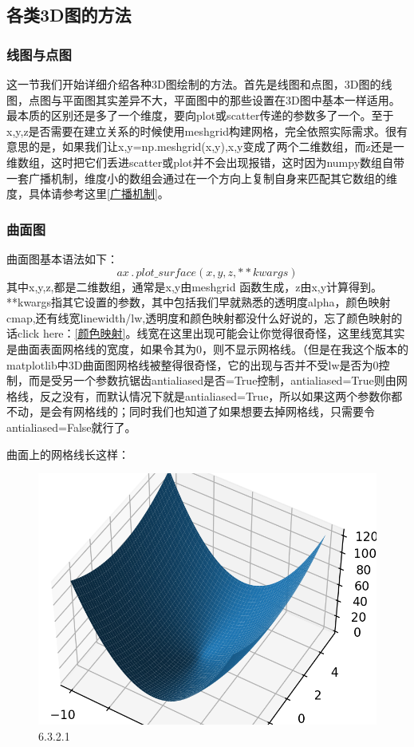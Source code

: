 \documentclass[12pt]{article}
\begin{document}
\subsection{各类3D图的方法}
\subsubsection{线图与点图}

这一节我们开始详细介绍各种3D图绘制的方法。首先是线图和点图，3D图的线图，点图与平面图其实差异不大，平面图中的那些设置在3D图中基本一样适用。最本质的区别还是多了一个维度，要向plot或scatter传递的参数多了一个。至于x,y,z是否需要在建立关系的时候使用meshgrid构建网格，完全依照实际需求。很有意思的是，如果我们让x,y=np.meshgrid(x,y),x,y变成了两个二维数组，而z还是一维数组，这时把它们丢进scatter或plot并不会出现报错，这时因为numpy数组自带一套广播机制，维度小的数组会通过在一个方向上复制自身来匹配其它数组的维度，具体请参考这里\ref{广播机制}。

\subsubsection{曲面图}
曲面图基本语法如下：
\[ax\,.\,plot\_surface(x,y,z,**kwargs)\]
其中x,y,z,都是二维数组，通常是x,y由meshgrid   函数生成，z由x,y计算得到。**kwargs指其它设置的参数，其中包括我们早就熟悉的透明度alpha，颜色映射cmap,还有线宽linewidth/lw,透明度和颜色映射都没什么好说的，忘了颜色映射的话click here：\ref{颜色映射}。线宽在这里出现可能会让你觉得很奇怪，这里线宽其实是曲面表面网格线的宽度，如果令其为0，则不显示网格线。（但是在我这个版本的matplotlib中3D曲面图网格线被整得很奇怪，它的出现与否并不受lw是否为0控制，而是受另一个参数抗锯齿antialiased是否=True控制，antialiased=True则由网格线，反之没有，而默认情况下就是antialiased=True，所以如果这两个参数你都不动，是会有网格线的；同时我们也知道了如果想要去掉网格线，只需要令antialiased=False就行了。

曲面上的网格线长这样：
\begin{figure}[H]
    \centering
    \includegraphics[width=0.75\linewidth]{3D 曲面图 网格线 Pic1.png}
    \caption{6.3.2.1}
    \label{fig:enter-label}
\end{figure}
\end{document}
